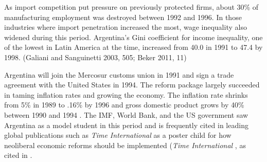\documentclass[12pt,a4paper]{article}\usepackage[]{graphicx}\usepackage[]{color}
\begin{document}
As import competition put pressure on previously protected firms, about 30\% of manufacturing employment was destroyed between 1992 and 1996. In those industries where import penetration increased the most, wage inequality also widened during this period. Argentina's Gini coefficient for income inequality, one of the lowest in Latin America at the time, increased from 40.0 in 1991 to 47.4 by 1998. (Galiani and Sanguinetti 2003, 505; Beker 2011, 11)

Argentina will join the Mercosur customs union in 1991 and sign a trade agreement with the United States in 1994. The reform package largely succeeded in taming inflation rates and growing the economy. The inflation rate shrinks from 5\% in 1989 to .16\% by 1996 and gross domestic product grows by 40\% between 1990 and 1994 \parencite[4]{Beker:2011vq}. The IMF, World Bank, and the US government saw Argentina as a model student in this period \parencites[142]{Cavallo:2004bf}{Cavallo:2004ta}[167]{Klein:2002vg} and is frequently cited in leading global publications such as \emph{Time International} as a poster child for how neoliberal economic reforms should be implemented (\emph{Time International} \cite*{:3GmqDB3y}, as cited in \cites[194]{Echegaray:2001tf}{MarcusDelgado:2003gn}{Silverstein:2002wm}.
\end{document}
